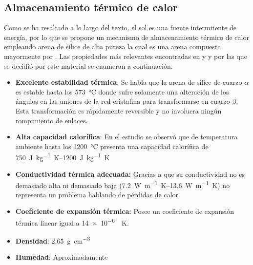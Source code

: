 		\subsection{Almacenamiento térmico de calor}
			
			Como se ha resaltado a lo largo del texto, el sol es una fuente intermitente de energía, por lo que se propone un mecanismo de almacenamiento térmico de calor empleando arena de sílice de alta pureza la cual es una arena compuesta mayormente por . Las propiedades más relevantes encontradas en \cite{davenport_thermal_2022} y \cite{wypych_2_2021} y por las que se decidió por este material se enumeran a continuación.
			
			\begin{itemize}
				\item \textbf{Excelente estabilidad térmica}: Se habla que la arena de sílice de cuarzo-$\alpha$ es estable hasta los \qty{573}{\degreeCelsius} donde sufre solamente una alteración de los ángulos en las uniones de la red cristalina para transformarse en cuarzo-$\beta$. Esta transformación es rápidamente reversible y no involucra ningún rompimiento de enlaces.
				\item \textbf{Alta capacidad calorífica}: En el estudio se observó que de temperatura ambiente hasta los \qty{1200}{\degreeCelsius} presenta una capacidad calorífica de \qtyrange{750}{1200}{\joule\per\kg\kelvin}
				\item \textbf{Conductividad térmica adecuada:} Gracias a que su conductividad no es demasiado alta ni demasiado baja (\qtyrange{7.2}{13.6}{\watt\per\m\kelvin}) no representa un problema hablando de pérdidas de calor.
				\item \textbf{Coeficiente de expansión térmica:} Posee un coeficiente de expansión térmica linear igual a \qty{14e-6}{\per\kelvin}.
				\item \textbf{Densidad}: \qty{2.65}{\g\per\cm\tothe{3}}
				\item \textbf{Humedad}: Aproximadamente 
			\end{itemize}
			
%			
			
